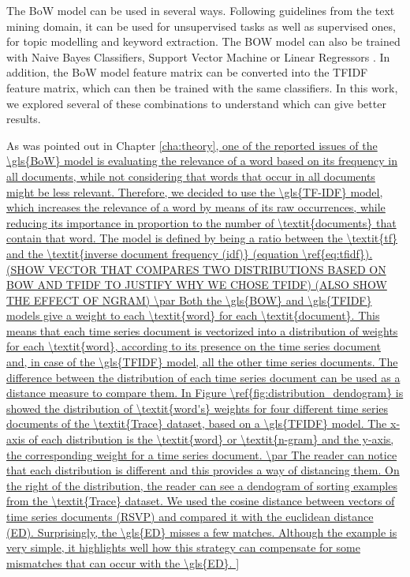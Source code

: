 The \gls{BoW} model can be used in several ways. Following guidelines from the text mining domain, it can be used for unsupervised tasks as well as supervised ones, for topic modelling and keyword extraction. The \gls{BOW} model can also be trained with Naive Bayes Classifiers, Support Vector Machine or Linear Regressors \cite{scikit-learn}. In addition, the \gls{BoW} model feature matrix can be converted into the \gls{TFIDF} feature matrix, which can then be trained with the same classifiers. In this work, we explored several of these combinations to understand which can give better results.
\par
As was pointed out in Chapter \ref{cha:theory], one of the reported issues of the \gls{BoW} model is evaluating the relevance of a word based on its frequency in all documents, while not considering that words that occur in all documents might be less relevant. Therefore, we decided to use the \gls{TF-IDF} model, which increases the relevance of a word by means of its raw occurrences, while reducing its importance in proportion to the number of \textit{documents} that contain that word. The model is defined by being a ratio between the \textit{tf} and the \textit{inverse document frequency (idf)} (equation \ref{eq:tfidf}).

(SHOW VECTOR THAT COMPARES TWO DISTRIBUTIONS BASED ON BOW AND TFIDF TO JUSTIFY WHY WE CHOSE TFIDF)

(ALSO SHOW THE EFFECT OF NGRAM)

\par
Both the \gls{BOW} and \gls{TFIDF} models give a weight to each \textit{word} for each \textit{document}. This means that each time series document is vectorized into a distribution of weights for each \textit{word}, according to its presence on the time series document and, in case of the \gls{TFIDF} model, all the other time series documents. The difference between the distribution of each time series document can be used as a distance measure to compare them. In Figure \ref{fig:distribution_dendogram} is showed the distribution of \textit{word's} weights for four different time series documents of the \textit{Trace} dataset, based on a \gls{TFIDF} model. The x-axis of each distribution is the \textit{word} or \textit{n-gram} and the y-axis, the corresponding weight for a time series document.
\par
The reader can notice that each distribution is different and this provides a way of distancing them. On the right of the distribution, the reader can see a dendogram of sorting examples from the \textit{Trace} dataset. We used the cosine distance between vectors of time series documents (RSVP) and compared it with the euclidean distance (ED). Surprisingly, the \gls{ED} misses a few matches. Although the example is very simple, it highlights well how this strategy can compensate for some mismatches that can occur with the \gls{ED}.

}
